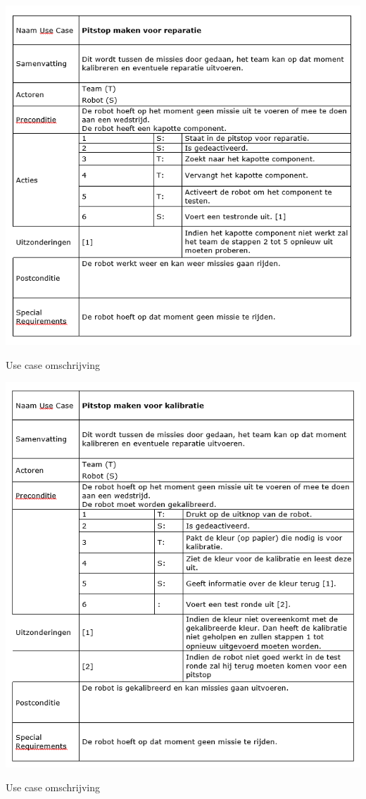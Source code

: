 \documentclass[12pt]{article} %
\begin{document}
\begin{center}
\begin{table}
\includegraphics[scale=.9]{uc3.png}
\caption{Use case omschrijving}
\label{tbl:usecase3}
\end{table}
\end{center}

\begin{center}
\begin{table}
\includegraphics[scale=.9]{uc4.png}
\caption{Use case omschrijving}
\label{tbl:usecase4}
\end{table}
\end{center}
\end{document}
